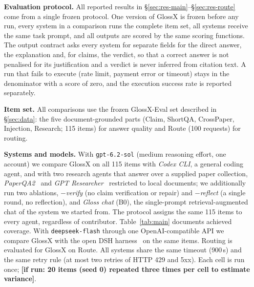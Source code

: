 \documentclass{article}
\newcommand{\sysname}{GlossX}
\newcommand{\gloss}{Gloss}
\newcommand{\ds}[1]{\textsf{#1}}
\newcommand{\TBD}[1]{\textcolor{glred}{\textbf{[#1]}}}
\newcommand{\code}[1]{\texttt{\small #1}}
\begin{document}
\textbf{Evaluation protocol.} All reported results in \S\ref{sec:res-main}--\S\ref{sec:res-route} come from a single frozen protocol. One version of \sysname{} is frozen before any run, every system in a comparison runs the complete item set, all systems receive the same task prompt, and all outputs are scored by the same scoring functions. The output contract asks every system for separate fields for the direct answer, the explanation and, for claims, the verdict, so that a correct answer is not penalised for its justification and a verdict is never inferred from citation text. A run that fails to execute (rate limit, payment error or timeout) stays in the denominator with a score of zero, and the execution success rate is reported separately.

\textbf{Item set.} All comparisons use the frozen \sysname{}-Eval set described in \S\ref{sec:data}: the five document-grounded parts (\ds{Claim}, \ds{ShortQA}, \ds{CrossPaper}, \ds{Injection}, \ds{Research}; 115 items) for answer quality and \ds{Route} (100 requests) for routing.

\textbf{Systems and models.} With \code{gpt-6.2-sol} (medium reasoning effort, one account) we compare \sysname{} on all 115 items with \emph{Codex CLI}, a general coding agent, and with two research agents that answer over a supplied paper collection, \emph{PaperQA2}~\cite{skarlinski2024paperqa2} and \emph{GPT Researcher}~\cite{gptresearcher} restricted to local documents; we additionally run two ablations, \emph{$-$verify} (no claim verification or repair) and \emph{$-$reflect} (a single round, no reflection), and \emph{\gloss{} chat} (B0), the single-prompt retrieval-augmented chat of the system we started from. The protocol assigns the same 115 items to every agent, regardless of contributor. Table~\ref{tab:main} documents achieved coverage. With \code{deepseek-flash} through one OpenAI-compatible API we compare \sysname{} with the open DSH harness~\cite{dsh2026} on the same items. Routing is evaluated for \sysname{} on \ds{Route}. All systems share the same timeout (900\,s) and the same retry rule (at most two retries of HTTP 429 and 5xx). Each cell is run once; \TBD{if run: 20 items (seed 0) repeated three times per cell to estimate variance}.
\end{document}
